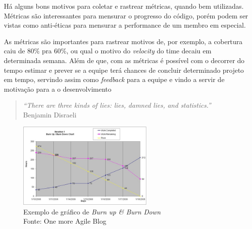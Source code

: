 


Há alguns bons motivos para coletar e rastrear métricas, quando bem utilizadas. Métricas são interessantes para mensurar o progresso do código, porém podem ser vistas como anti-éticas para mensurar a performance de um membro em especial\cite{crispin2009agile}.

As métricas são importantes para rastrear motivos de, por exemplo, a cobertura caiu de 80\% pra 60\%, ou qual o motivo do \textit{velocity} do time decaiu em determinada semana.
Além de que, com as métricas é possível com o decorrer do tempo estimar e prever se a equipe terá chances de concluir determinado projeto em tempo, servindo assim como \textit{feedback} para a equipe e vindo a servir de motivação para a o desenvolvimento

\begin{quote}
	\textit{“There are three kinds of lies: lies, damned lies, and statistics.”}\\Benjamin Disraeli
\end{quote}

\begin{figure}[h]
	\centering
	\includegraphics[width=0.6\textwidth]{conteudo/burnup}
	\caption{Exemplo de gráfico de \textit{Burn up \& Burn Down}\\ Fonte: One more Agile Blog\protect\footnotemark}
\end{figure}

